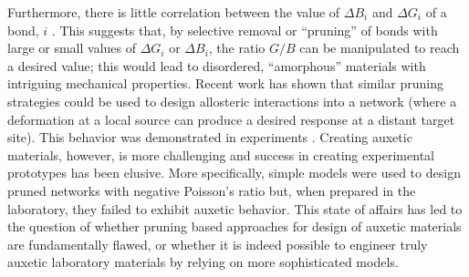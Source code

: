 \documentclass[9pt,twocolumn,twoside]{pnas-new}
\begin{document}
Furthermore, there is little correlation between the value of $\Delta B_{i}$ and $\Delta G_{i}$ of a bond, $i$ \cite{hexner2017linking}.  This suggests that, by selective removal or ``pruning'' of bonds with large or small values of $\Delta G_i$ or $\Delta B_i$, the ratio $G/B$ can be manipulated to reach a desired value; this would lead to disordered, ``amorphous'' materials with intriguing mechanical properties.  Recent work has shown that similar pruning strategies could be used to design allosteric interactions into a network (where a  deformation at a local source can produce a desired response at a distant target site).  This behavior was demonstrated in experiments \cite{rocks2017designing}. Creating auxetic materials, however, is more challenging and success in creating experimental prototypes has been elusive.  More specifically, simple models were used to design pruned networks with negative Poisson's ratio but, when prepared in the laboratory, they failed to exhibit auxetic behavior. This state of affairs has led to the question of whether pruning based approaches for design of auxetic materials are fundamentally flawed, or whether it is indeed possible to engineer truly auxetic laboratory materials by relying on more sophisticated models. 

\paragraph{}
\end{document}
